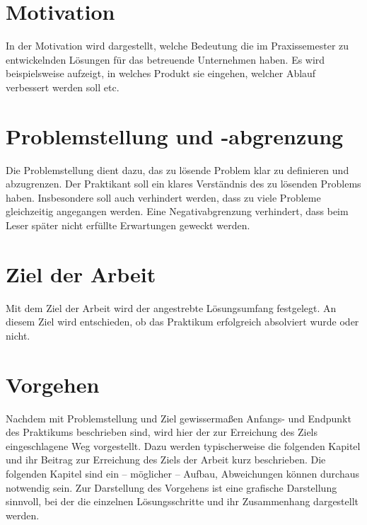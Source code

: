 \documentclass[oneside]{ausarbeitung}
\begin{document}
\section{Motivation}
\label{sec:motivation}

In der Motivation wird dargestellt, welche Bedeutung die im 
Praxissemester zu entwickelnden Lösungen für das betreuende Unternehmen 
haben. Es wird beispielsweise aufzeigt, in welches Produkt sie eingehen, 
welcher Ablauf verbessert werden soll etc.

\section{Problemstellung und -abgrenzung}
\label{sec:problemstellung}

Die Problemstellung dient dazu, das zu lösende Problem klar zu 
definieren und abzugrenzen. Der Praktikant soll ein klares Verständnis 
des zu lösenden Problems haben. Insbesondere soll auch verhindert 
werden, dass zu viele Probleme gleichzeitig angegangen werden. Eine 
Negativabgrenzung verhindert, dass beim Leser später nicht erfüllte 
Erwartungen geweckt werden.

\section{Ziel der Arbeit}
\label{sec:ziel}

Mit dem Ziel der Arbeit wird der angestrebte Lösungsumfang festgelegt. An diesem Ziel wird entschieden, ob das Praktikum erfolgreich absolviert wurde oder nicht.

\section{Vorgehen}
\label{sec:vorgehen}

Nachdem mit Problemstellung und Ziel gewissermaßen Anfangs- und Endpunkt 
des Praktikums beschrieben sind, wird hier der zur Erreichung des Ziels 
eingeschlagene Weg vorgestellt. Dazu werden typischerweise die folgenden 
Kapitel und ihr Beitrag zur Erreichung des Ziels der Arbeit kurz 
beschrieben. Die folgenden Kapitel sind ein – möglicher – Aufbau, 
Abweichungen können durchaus notwendig sein. Zur Darstellung des 
Vorgehens ist eine grafische Darstellung sinnvoll, bei der die einzelnen 
Lösungsschritte und ihr Zusammenhang dargestellt werden. 

\end{document}
